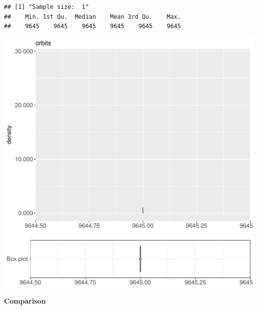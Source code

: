 \documentclass{article}\usepackage[]{graphicx}\usepackage[]{color}
\makeatletter
\def\maxwidth{ %
  \ifdim\Gin@nat@width>\linewidth
    \linewidth
  \else
    \Gin@nat@width
  \fi
}
\newenvironment{kframe}{%
 \def\at@end@of@kframe{}%
 \ifinner\ifhmode%
  \def\at@end@of@kframe{\end{minipage}}%
  \begin{minipage}{\columnwidth}%
 \fi\fi%
 \def\FrameCommand##1{\hskip\@totalleftmargin \hskip-\fboxsep
 \colorbox{shadecolor}{##1}\hskip-\fboxsep
     \hskip-\linewidth \hskip-\@totalleftmargin \hskip\columnwidth}%
 \MakeFramed {\advance\hsize-\width
   \@totalleftmargin\z@ \linewidth\hsize
   \@setminipage}}%
 {\par\unskip\endMakeFramed%
 \at@end@of@kframe}
\newenvironment{knitrout}{}{} %
\makeatother
\begin{document}
\begin{knitrout}
\color{fgcolor}\begin{kframe}
\begin{verbatim}
## [1] "Sample size:  1"
##    Min. 1st Qu.  Median    Mean 3rd Qu.    Max. 
##    9645    9645    9645    9645    9645    9645
\end{verbatim}


{\ttfamily\noindent\bfseries{}}\end{kframe}
\includegraphics[width=\maxwidth]{figure/RH9_cashewExceptRenameVar_small-1} 

\end{knitrout}
  
 \textbf{Comparison}
  
\end{document}
